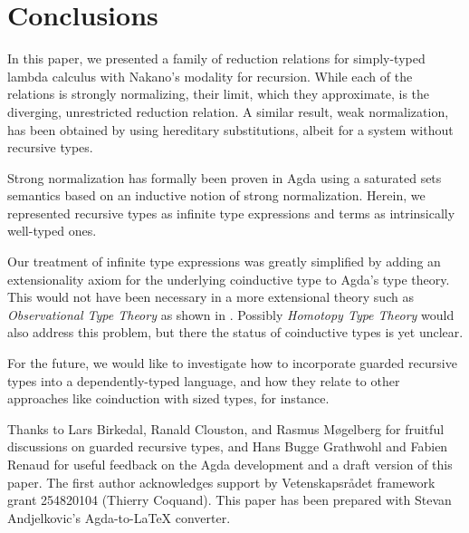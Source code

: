 
\section{Conclusions}
\label{sec:concl}

In this paper, we presented a family of reduction
relations for simply-typed lambda calculus with Nakano's modality for
recursion.  While each of the relations is strongly normalizing, their
limit, which they approximate, is the diverging, unrestricted
reduction relation.  A similar result, weak normalization, has been obtained by
\cite{krishnaswamiBenton:icfp11}
using hereditary substitutions, albeit
for a system without recursive types.

Strong normalization has formally been proven in Agda using a
saturated sets semantics based on an inductive notion of strong
normalization.  Herein, we represented recursive types as infinite
type expressions and terms as intrinsically well-typed ones.

Our treatment of infinite type expressions was greatly simplified by
adding an extensionality axiom for the underlying coinductive type to
Agda's type theory.  This would not have been necessary in a more
extensional theory such as \emph{Observational Type Theory}
\citep{altenkirchMcBrideSwierstra:plpv07} as shown in \citep{mcBride:unfold}.  Possibly \emph{Homotopy Type
Theory} \citep{hott}
would also address this problem, but there the status of
coinductive types is yet unclear.

For the future, we would like to investigate how to incorporate
guarded recursive types into a dependently-typed language, and how
they relate to other approaches like coinduction with sized
types, for instance.

Thanks to Lars Birkedal, Ranald Clouston, and Rasmus M\o{}gelberg for
fruitful discussions on guarded recursive types, and Hans Bugge
Grathwohl and Fabien Renaud for useful feedback on the Agda
development and a draft version of this paper.
The first author acknowledges support by Vetenskapsr\aa{}det framework
grant 254820104 (Thierry Coquand).  This paper has been prepared with
Stevan Andjelkovic's Agda-to-LaTeX converter.


